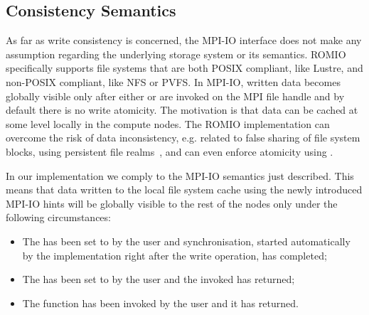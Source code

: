 
\subsection{Consistency Semantics}
\label{subsec: consistency}
As far as write consistency is concerned, the MPI-IO interface does not make any assumption regarding the underlying storage system or its semantics. ROMIO specifically supports file systems that are both POSIX compliant, like Lustre, and non-POSIX compliant, like NFS or PVFS. In MPI-IO, written data becomes globally visible only after either  or  are invoked on the MPI file handle and by default there is no write atomicity. The motivation is that data can be cached at some level locally in the compute nodes. The ROMIO implementation can overcome the risk of data inconsistency, e.g. related to false sharing of file system blocks, using persistent file realms~\cite{ColomaCWWRP04}, and can even enforce atomicity using .

In our implementation we comply to the MPI-IO semantics just described. This means that data written to the local file system cache using the newly introduced MPI-IO hints will be globally visible to the rest of the nodes only under the following circumstances:
\begin{itemize}
\item The  has been set to  by the user and synchronisation, started automatically by the implementation right after the write operation, has completed;
\item The  has been set to  by the user and the invoked  has returned;
\item The  function has been invoked by the user and it has returned.
\end{itemize}

